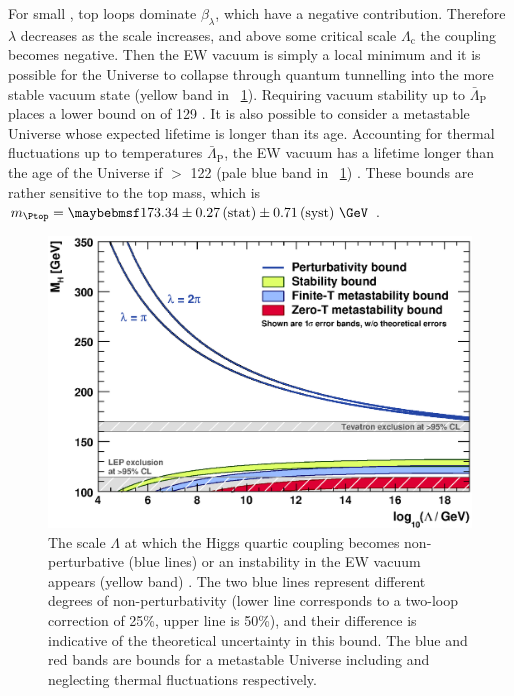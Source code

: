 For small \mH, top loops dominate $\beta_{\lambda}$, which have a negative 
contribution. Therefore $\lambda$ decreases as the scale increases, and above some 
critical scale $\Lambda_{\text{c}}$ the coupling becomes negative. Then the EW 
vacuum is simply a local minimum and it is possible for the Universe to collapse through
quantum tunnelling into the more stable vacuum state (yellow band in 
\Figure~\ref{fig:theory_constraints}). Requiring vacuum stability up to 
$\bar{\Lambda}_{\text{P}}$ places a lower bound on \mH of \unit{129}{\GeV} 
\cite{Ellis:2009}. 
It is also possible to consider a metastable Universe whose expected lifetime is longer 
than its age. Accounting for thermal fluctuations up to temperatures 
\about$\bar{\Lambda}_{\text{P}}$, the EW vacuum has a lifetime longer than the age 
of the Universe if \mH $>$ \unit{122}{\GeV} (pale blue band in 
\Figure~\ref{fig:theory_constraints}) \cite{Ellis:2009}. These bounds are rather 
sensitive to the top mass, which is 
$m_{\Ptop} = \statsyst{173.34}{0.27}{0.71}~\GeV$ \cite{TopMass}.

\begin{figure}[t]
	\includegraphics[width=\mediumfigwidth]{tex/motivation/theory_constraints}
	\caption{The scale $\Lambda$ at which the Higgs quartic coupling becomes 
	non-perturbative (blue lines) or an instability in the EW vacuum appears
	(yellow band) \cite{Ellis:2009}. The two blue lines represent different degrees of 
	non-perturbativity (lower line corresponds to a two-loop correction of 25\%, upper 
	line is 50\%), and their difference is indicative of the theoretical uncertainty in 
	this bound. The blue and red bands are bounds for a metastable Universe including and
	neglecting thermal fluctuations respectively.}
	\label{fig:theory_constraints}
\end{figure}
